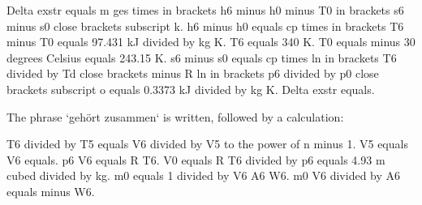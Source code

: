 Delta exstr equals m ges times in brackets h6 minus h0 minus T0 in brackets s6 minus s0 close brackets subscript k. h6 minus h0 equals cp times in brackets T6 minus T0 equals 97.431 kJ divided by kg K. T6 equals 340 K. T0 equals minus 30 degrees Celsius equals 243.15 K. s6 minus s0 equals cp times ln in brackets T6 divided by Td close brackets minus R ln in brackets p6 divided by p0 close brackets subscript o equals 0.3373 kJ divided by kg K. Delta exstr equals.

The phrase `gehört zusammen` is written, followed by a calculation:

T6 divided by T5 equals V6 divided by V5 to the power of n minus 1. V5 equals V6 equals. p6 V6 equals R T6. V0 equals R T6 divided by p6 equals 4.93 m cubed divided by kg. m0 equals 1 divided by V6 A6 W6. m0 V6 divided by A6 equals minus W6.